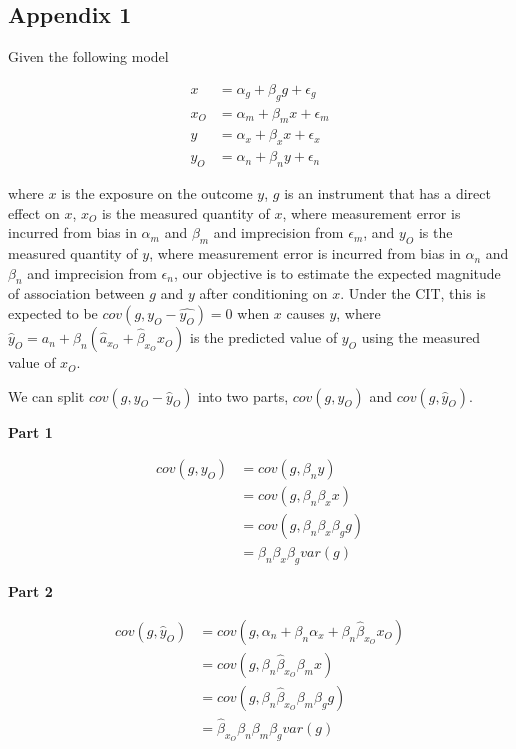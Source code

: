 \documentclass[]{article}
\begin{document}
\newpage

\subsection{Appendix 1}\label{appendix-1}

Given the following model

\[
\begin{aligned}
x   & = \alpha_g + \beta_g g + \epsilon_g \\
x_O & = \alpha_m + \beta_m x + \epsilon_m \\
y   & = \alpha_x + \beta_x x + \epsilon_x \\
y_O & = \alpha_n + \beta_n y + \epsilon_n
\end{aligned}
\]

where $x$ is the exposure on the outcome $y$, $g$ is an instrument that
has a direct effect on $x$, $x_O$ is the measured quantity of $x$, where
measurement error is incurred from bias in $\alpha_m$ and $\beta_m$ and
imprecision from $\epsilon_m$, and $y_O$ is the measured quantity of
$y$, where measurement error is incurred from bias in $\alpha_n$ and
$\beta_n$ and imprecision from $\epsilon_n$, our objective is to
estimate the expected magnitude of association between $g$ and $y$ after
conditioning on $x$. Under the CIT, this is expected to be
$cov(g, y_O - \hat{y_O}) = 0$ when $x$ causes $y$, where
$\hat{y}_O = a_n + \beta_n(\hat{a}_{x_O} + \hat{\beta}_{x_O} x_O)$ is
the predicted value of $y_O$ using the measured value of $x_O$.

We can split $cov(g, y_O - \hat{y}_O)$ into two parts, $cov(g, y_O)$ and
$cov(g, \hat{y}_O)$.

\textbf{Part 1}

\[
\begin{aligned}
cov(g, y_O) & = cov(g, \beta_n y) \\
            & = cov(g, \beta_n \beta_x x) \\
            & = cov(g, \beta_n \beta_x \beta_g g) \\
            & = \beta_n \beta_x \beta_g var(g)
\end{aligned}
\]

\textbf{Part 2}

\[
\begin{aligned}
cov(g, \hat{y}_O) & = cov(g, \alpha_n + \beta_n \alpha_x + \beta_n \hat{\beta}_{x_O} x_O) \\
                  & = cov(g, \beta_n \hat{\beta}_{x_O} \beta_m x) \\
                  & = cov(g, \beta_n \hat{\beta}_{x_O} \beta_m \beta_g g) \\
                  & = \hat{\beta}_{x_O} \beta_n \beta_m \beta_g var(g)
\end{aligned}
\]
\end{document}
